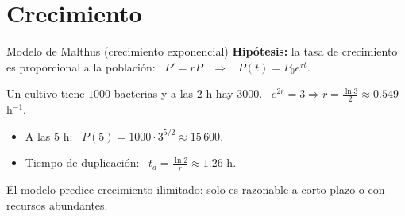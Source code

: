 \documentclass[10pt,aspectratio=169]{beamer}
\begin{document}
\section{Crecimiento}

\begin{frame}{Modelo de Malthus (crecimiento exponencial)}
  \textbf{Hipótesis:} la tasa de crecimiento es proporcional a la población: \ $P'=rP$ \ $\Rightarrow$ \ $P(t)=P_0e^{rt}$.
  \begin{ejemplo}[5]
    Un cultivo tiene $1000$ bacterias y a las $2$ h hay $3000$. \ $e^{2r}=3\Rightarrow r=\frac{\ln3}{2}\approx0.549$ h$^{-1}$.
    \begin{itemize}
      \item A las $5$ h: \ $P(5)=1000\cdot3^{5/2}\approx15\,600$.
      \item Tiempo de duplicación: \ $t_d=\frac{\ln2}{r}\approx1.26$ h.
    \end{itemize}
  \end{ejemplo}
  \begin{observacion}
    El modelo predice crecimiento ilimitado: solo es razonable a corto plazo o con recursos abundantes.
  \end{observacion}
\end{frame}
\end{document}
